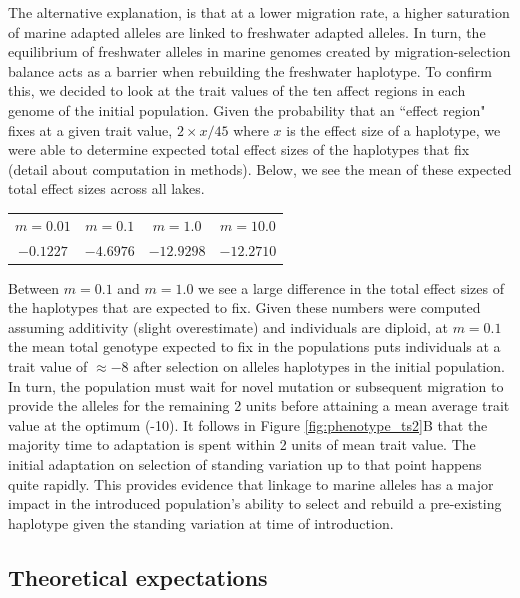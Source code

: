 \documentclass{article}
\newcommand{\plr}[1]{\todo[linecolor=blue,backgroundcolor=blue!25,bordercolor=blue]{#1}}
\begin{document}
The alternative explanation, is that at a lower migration rate, a higher saturation of marine adapted alleles are linked to freshwater adapted alleles.
In turn, the equilibrium of freshwater alleles in marine genomes created by migration-selection balance acts as a barrier when rebuilding the freshwater haplotype. 
To confirm this, we decided to look at the trait values of the ten affect regions in each genome of the initial population.
Given the probability that an ``effect region" fixes at a given trait value, $2 \times x / 45$ where $x$ is the effect size of a haplotype,
we were able to determine expected total effect sizes of the haplotypes that fix (detail about computation in methods).
Below, we see the mean of these expected total effect sizes across all lakes.

\begin{center}
\begin{tabular}{ | c | c  | c  | c | }
 \hline
 $m = 0.01$ & $m = 0.1$ & $m = 1.0$ & $m = 10.0$ \\ 
 $-0.1227$ &  $-4.6976$ & $-12.9298$  & $-12.2710$\\
 \hline
\end{tabular}
\end{center}

Between $m = 0.1$ and $m = 1.0$ we see a large difference in the total effect sizes of the haplotypes that are expected to fix.
Given these numbers were computed assuming additivity (slight overestimate) and individuals are diploid,
at $m = 0.1$ the mean total genotype expected to fix in the populations puts individuals at a trait value of $\approx -8$ 
after selection on alleles haplotypes in the initial population. 
In turn, the population must wait for novel mutation or subsequent migration to provide the alleles for the remaining 2 units before 
attaining a mean average trait value at the optimum (-10).
It follows in Figure \ref{fig:phenotype_ts2}B that the majority time to adaptation is spent within 2 units of mean trait value.
The initial adaptation on selection of standing variation up to that point happens quite rapidly.
This provides evidence that linkage to marine alleles has a major impact in the introduced population's ability 
to select and rebuild a pre-existing haplotype given the standing variation at time of introduction. 

\subsection*{Theoretical expectations}
\plr{does this go first or second?}
\end{document}
